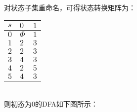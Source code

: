 \documentclass{article}
\begin{document}
\\
对状态子集重命名，可得状态转换矩阵为：
\begin{table}[h]
    \centering
\begin{tabular}{|p{3cm}<{\centering}|p{3cm}<{\centering}|p{3cm}<{\centering}|}   
    \hline
    $s$ & $0$ & $1$ \\
    \hline
    $0$ & $\Phi$ & $1$ \\
    \hline
    $1$ & $2$ & $3$ \\
    \hline
    $2$ & $2$ & $3$ \\
    \hline
    $3$ & $4$ & $3$ \\
    \hline
    $4$ & $2$ & $5$ \\
    \hline
    $5$ & $4$ & $3$ \\
    \hline
\end{tabular}
\end{table}
\\
则初态为0的DFA如下图所示：
\end{document}
